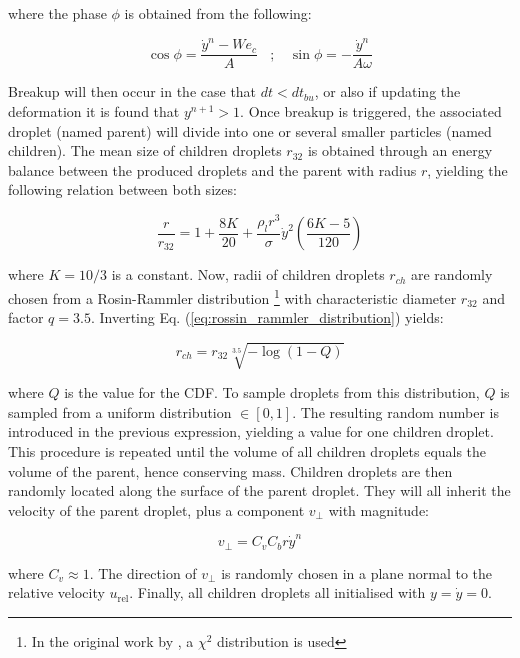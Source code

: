 where the phase $\phi$ is obtained from the following:

\begin{equation}
\cos \phi = \frac{\dot{y}^n - We_c}{A} ~~~~ ; ~~~~ \sin \phi = - \frac{\dot{y}^n}{A \omega}
\end{equation}

Breakup will then occur in the case that $dt < dt_{bu}$, or also if updating the deformation it is found that $y^{n+1} > 1$. Once breakup is triggered, the associated droplet (named parent) will divide into one or several smaller particles (named children). The mean size of children droplets $r_{32}$ is obtained through an energy balance between the produced droplets and the parent with radius $r$, yielding the following relation between both sizes:

\begin{equation}
\label{eq:TAB_model_radius_ratio}
\frac{r}{r_{32}} = 1 + \frac{8 K}{20} + \frac{\rho_l r^3}{\sigma} \dot{y}^2 \left( \frac{6 K - 5}{120} \right)
\end{equation}

where $K = 10/3$ is a constant. Now, radii of children droplets $r_{ch}$ are randomly chosen from a Rosin-Rammler distribution \footnote{In the original work by , a $\chi^2$ distribution is used} with characteristic diameter $r_{32}$ and factor $q = 3.5$. Inverting Eq. (\ref{eq:rossin_rammler_distribution}) yields:

\begin{equation}
r_{ch} = r_{32} \sqrt[3.5]{- \log \left( 1 - Q \right) }
\end{equation}

where $Q$ is the value for the CDF. To sample droplets from this distribution, $Q$ is sampled from a uniform distribution $\in [0,1]$. The resulting random number is introduced in the previous expression, yielding a value for one children droplet. This procedure is repeated until the volume of all children droplets equals the volume of the parent, hence conserving mass. Children droplets are then randomly located along the surface of the parent droplet. They will all inherit the velocity of the parent droplet, plus a component $v_\perp$ with magnitude:

\begin{equation}
\label{eq:TAB_v_perp}
v_\perp = C_v C_b r \dot{y}^n
\end{equation}

where $C_v \approx 1$. The direction of $v_\perp$ is randomly chosen in a plane normal to the relative velocity $u_\mathrm{rel}$. Finally, all children droplets all initialised with $y = \dot{y} = 0$.



